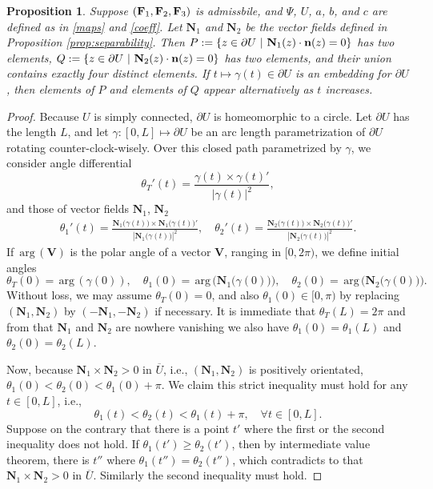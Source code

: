 \documentclass[11pt]{amsart}
\theoremstyle{plain}
\newtheorem{Prop}[Thm]{Proposition}
\theoremstyle{remark}
\numberwithin{equation}{section}
\numberwithin{Thm}{section}
\def\N{{\mathbf N}}
\def\F{{\bf F}}
\def\n{{\bf n}}
\def\arg{{\,\textrm{arg}\,}}
\begin{document}
\begin{Prop} \label{lemma:anisogeom}
Suppose $(\F_1,\F_2,\F_3)$ is admissbile, and $\Psi$, $U$, $a$, $b$, and $c$ are defined as in \eqref{maps} and \eqref{coeff}. Let $\N_1$ and $\N_2$ be the vector fields defined in Proposition \ref{prop:separability}. 
Then $P:=\left\{ z\in \partial U ~|~ \N_1(z)\cdot \n(z) = 0\right\}$ has two elements, $Q:=\left\{ z\in \partial U ~|~ \N_2(z)\cdot \n(z) = 0\right\}$ has two elements, and their union contains exactly four distinct elements. If $t \mapsto \gamma(t) \in \partial U$ is an embedding for $\partial U$, then elements of $P$ and elements of $Q$ appear alternatively as $t$ increases.
\end{Prop}
\begin{proof}
 Because $U$ is simply connected, $\partial U$ is homeomorphic to a circle. Let $\partial U$ has the length $L$, and let $\gamma : [0,L] \mapsto \partial U$ be an arc length parametrization of $\partial U$ rotating counter-clock-wisely.  Over this closed path parametrized by $\gamma$,  we consider angle differential 
 $$\theta_T'(t) = \frac{\gamma(t) \times \gamma(t)'}{|\gamma(t)|^2},$$
 and those of vector fields $\N_1$, $\N_2$
\begin{align*}
  \theta_1'(t) = \frac{\N_1\big(\gamma(t)\big) \times \N_1\big(\gamma(t)\big)'}{|\N_1\big(\gamma(t)\big)|^2}, \quad  \theta_2'(t) = \frac{\N_2\big(\gamma(t)\big) \times \N_2\big(\gamma(t)\big)'}{|\N_2\big(\gamma(t)\big)|^2}.
 \end{align*}
If $\arg(\mathbf{V})$ is the polar angle of a vector $\mathbf{V}$, ranging in $[0,2\pi)$, we define initial angles 
$$\theta_T(0) = \arg(\gamma(0)), \quad \theta_1(0) = \arg\Big(\N_1\big(\gamma(0)\big)\Big),\quad \theta_2(0) = \arg\Big(\N_2\big(\gamma(0)\big)\Big).$$
Without loss, we may assume $\theta_T(0) = 0$, and also $\theta_1(0) \in [0,\pi)$ by replacing $(\N_1,\N_2)$ by $(-\N_1,-\N_2)$ if necessary. It is immediate that $\theta_T(L) = 2\pi$ and from that $\N_1$ and $\N_2$ are nowhere vanishing we also have $\theta_1(0)=\theta_1(L)$ and $\theta_2(0)=\theta_2(L)$.

Now, because $\N_1 \times \N_2 > 0$ in $\overline U$, i.e., $(\N_1,\N_2)$ is positively orientated, $\theta_1(0) < \theta_2(0) < \theta_1(0) + \pi$. We claim this strict inequality must hold for any $t\in[0,L]$, i.e.,
\begin{equation} \label{strinq}
\theta_1(t) < \theta_2(t) < \theta_1(t) + \pi, \quad \forall t\in[0,L]. 
\end{equation}
Suppose on the contrary that there is a point $t'$ where the first or the second inequality does not hold. If $\theta_1(t') \ge \theta_2(t')$, then by intermediate value theorem, there is $t''$ where $\theta_1(t'') = \theta_2(t'')$, which contradicts to that $\N_1\times \N_2>0$ in $\overline U$. Similarly the second inequality must hold. 


\end{proof}
\end{document}

